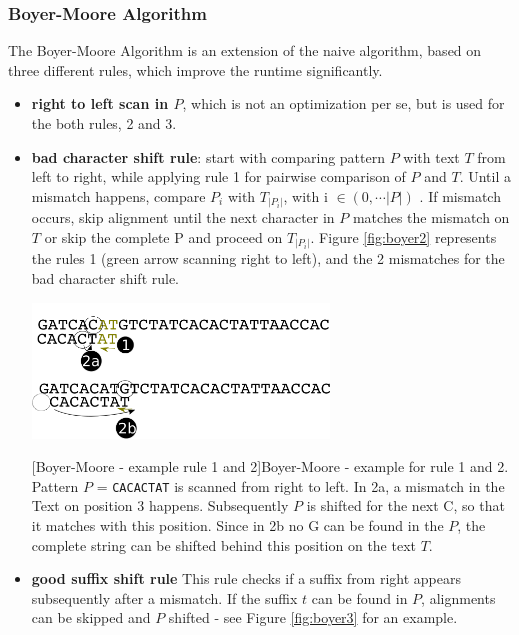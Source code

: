 \subsubsection{Boyer-Moore Algorithm}
The Boyer-Moore Algorithm is an extension of the naive algorithm, based on three different rules, which improve the runtime significantly. 
\begin{itemize}
\item[1] \textbf{right to left scan in $P$}, which is not an optimization per se, but is used for the both rules, 2 and 3. 
\item[2] \textbf{bad character shift rule}: start with comparing pattern $P$ with text $T$ from left to right, while applying rule 1 for pairwise comparison of $P$ and $T$. Until a mismatch happens, compare $P_i$ with $T_{|P_i|}$, with i $\in (0,\cdots |P|)$ . If mismatch occurs, skip alignment until the next character in $P$ matches the mismatch on $T$ or skip the complete P and proceed on $T_{|P_i|}$. Figure \ref{fig:boyer2} represents the rules 1 (green arrow scanning right to left), and the 2 mismatches for the bad character shift rule.
 \begin{minipage}{\linewidth}
    \centering
    \includegraphics[width=0.62\textwidth]{images/boyer2.png}
    
         [Boyer-Moore - example rule 1 and 2]{Boyer-Moore - example for rule 1 and 2. Pattern $P$ = \texttt{CACACTAT} is scanned from right to left. In 2a, a mismatch in the Text on position 3 happens. Subsequently $P$ is shifted for the next C, so that it matches with this position. Since in 2b no G can be found in the $P$, the complete string can be shifted behind this position on the text $T$.}
       \label{fig:boyer2} 
       \end{minipage}

\item[3] \textbf{good suffix shift rule} This rule checks if a suffix from right appears subsequently after a mismatch. If the suffix $t$ can be found in $P$, alignments can be skipped and $P$ shifted - see Figure \ref{fig:boyer3} for an example.
 \begin{minipage}{\linewidth}


\end{minipage}
\end{itemize}
